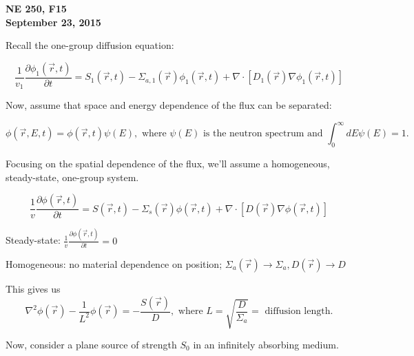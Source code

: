 \documentclass[12pt]{article}
\newcommand{\rvec}{\ensuremath{\vec{r}}}
\newcommand{\vecr}{\ensuremath{\vec{r}}}
\begin{document}
\begin{center}
{\bf NE 250, F15\\
September 23, 2015 
}
\end{center}


Recall the one-group diffusion equation:

\begin{equation*}
\frac{1}{v_1}\frac{\partial \phi_1(\rvec,t)}{\partial t} = S_1(\rvec,t) - 
\Sigma_{a,1}(\rvec)\phi_1(\rvec,t) + \nabla\cdot[D_1(\rvec)\nabla\phi_1(\rvec,t)]
\end{equation*}

Now, assume that space and energy dependence of the flux can be separated:

\begin{equation*}
\phi(\vecr,E,t) = \phi(\vecr,t)\psi(E), 
\text{ where $\psi(E)$ is the neutron spectrum and $\int_0^{\infty}dE\psi(E) = 1$.}
\end{equation*}

Focusing on the spatial dependence of the flux, we'll assume a homogeneous, steady-state, one-group system.

\begin{equation*}
\frac{1}{v}\frac{\partial\phi(\rvec,t)}{\partial t} = S(\rvec,t) - \Sigma_s(\rvec)\phi(\rvec,t)
+ \nabla\cdot[D(\rvec)\nabla\phi(\rvec,t)]
\end{equation*}

Steady-state: $\frac{1}{v}\frac{\partial\phi(\rvec,t)}{\partial t} = 0$


Homogeneous: no material dependence on position; 
$\Sigma_a(\rvec)\rightarrow\Sigma_a, D(\rvec)\rightarrow D$


This gives us
%
%
%
\begin{equation*}
\nabla^2\phi(\vecr) - \frac{1}{L^2}\phi(\rvec) = -\frac{S(\rvec)}{D},
\text{ where $L = \sqrt{\frac{D}{\Sigma_a}} =$ diffusion length.}
\end{equation*}


Now, consider a plane source of strength $S_0$ in an infinitely absorbing medium.
\end{document}
